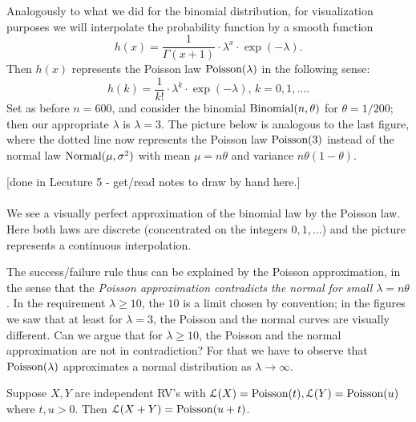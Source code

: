 Analogously to what we did for the binomial distribution, for visualization
purposes we will interpolate the probability function by a smooth function 
\begin{equation*}
h(x)=\frac{1}{\Gamma (x+1)}\cdot \lambda ^{x}\cdot \exp (-\lambda ).
\end{equation*}%
Then $h(x)$ represents the Poisson law $\mbox{{\rm Poisson}}(\lambda )$ in the
following sense: 
\begin{equation*}
h(k)=\frac{1}{k!}\cdot \lambda ^{k}\cdot \exp (-\lambda )\text{, }%
k=0,1,\ldots .
\end{equation*}%
Set as before $n=600$, and consider the binomial $\mbox{{\rm Binomial}}(n,\theta)$ for $\theta=1/200$;
then our appropriate $\lambda $ is $\lambda =3$. The picture below 
is analogous to the last figure, where the dotted line now
represents the Poisson law $\mbox{{\rm Poisson}}(3)$ instead of the normal law $\mbox{{\rm Normal}}(\mu
,\sigma ^{2})$ with mean $\mu =n\theta$ and variance $n\theta(1-\theta)$.


{\scriptsize [done in Lecuture 5 - get/read notes to draw by hand here.]}\\
\vspace{3cm} 
~\\


We see a visually perfect approximation of the binomial law by
the Poisson law. Here both laws are discrete (concentrated on the integers $%
0,1,\ldots $) and the picture represents a continuous interpolation.

The success/failure rule thus can be explained by the Poisson approximation,
in the sense that the \textit{Poisson approximation contradicts the normal
for small }$\lambda =n\theta$. In the requirement $\lambda \geq 10$, the $10$ is
a limit chosen by convention; in the figures we saw that at least for $%
\lambda =3$, the Poisson and the normal curves are visually different. Can
we argue that for $\lambda \geq 10$, the Poisson and the normal
approximation are not in contradiction? For that we have to observe that $%
\poisson(\lambda )$ approximates a normal distribution as $\lambda
\rightarrow \infty $. \bigskip

\begin{Exercise}[title={Sum of independent $\poisson$ RVs is a $\poisson$ RV},label={SumOfIndPoissons}]
Suppose $X,Y$ are independent RV's with $\mathcal{L}(X)=%
\poisson(t),\mathcal{L}(Y)=\poisson(u)$ where $t,u>0$. Then $\mathcal{L%
}(X+Y)=\poisson(u+t)$.
\end{Exercise}

